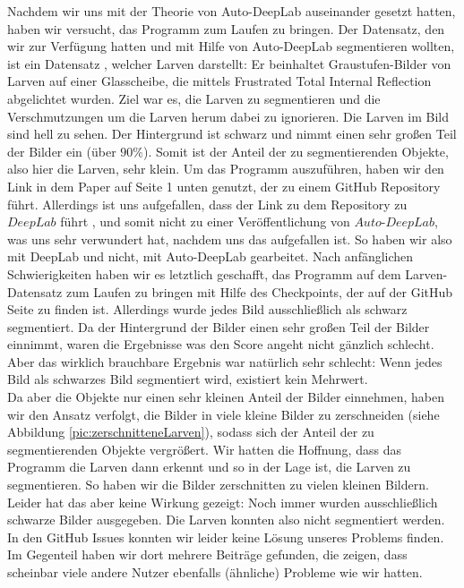 Nachdem wir uns mit der Theorie von Auto-DeepLab auseinander gesetzt hatten, haben wir versucht, das Programm zum Laufen zu bringen. Der Datensatz, den wir zur Verfügung hatten und mit Hilfe von Auto-DeepLab segmentieren wollten, ist ein Datensatz \cite{larven}, welcher Larven darstellt: Er beinhaltet Graustufen-Bilder von Larven auf einer Glasscheibe, die mittels Frustrated Total Internal Reflection abgelichtet wurden. Ziel war es, die Larven zu segmentieren und die Verschmutzungen um die Larven herum dabei zu ignorieren. Die Larven im Bild sind hell zu sehen. Der Hintergrund ist schwarz und nimmt einen sehr großen Teil der Bilder ein (über $90\%$). Somit ist der Anteil der zu segmentierenden Objekte, also hier die Larven, sehr klein. Um das Programm auszuführen, haben wir den Link in dem Paper \cite{autodeeplabPaper} auf Seite 1 unten genutzt, der zu einem GitHub Repository führt. Allerdings ist uns aufgefallen, dass der Link zu dem Repository zu $\textit{DeepLab}$ führt \cite{deeplabGithub}, und somit nicht zu einer Veröffentlichung von $\textit{Auto-DeepLab}$, was uns sehr verwundert hat, nachdem uns das aufgefallen ist. So haben wir also mit DeepLab und nicht, mit Auto-DeepLab gearbeitet. Nach anfänglichen Schwierigkeiten haben wir es letztlich geschafft, das Programm auf dem Larven-Datensatz zum Laufen zu bringen mit Hilfe des Checkpoints, der auf der GitHub Seite zu finden ist. Allerdings wurde jedes Bild ausschließlich als schwarz segmentiert. Da der Hintergrund der Bilder einen sehr großen Teil der Bilder einnimmt, waren die Ergebnisse was den Score angeht nicht gänzlich schlecht. Aber das wirklich brauchbare Ergebnis war natürlich sehr schlecht: Wenn jedes Bild als schwarzes Bild segmentiert wird, existiert kein Mehrwert.\\
Da aber die Objekte nur einen sehr kleinen Anteil der Bilder einnehmen, haben wir den Ansatz verfolgt, die Bilder in viele kleine Bilder zu zerschneiden (siehe Abbildung \ref{pic:zerschnitteneLarven}), sodass sich der Anteil der zu segmentierenden Objekte vergrößert. Wir hatten die Hoffnung, dass das Programm die Larven dann erkennt und so in der Lage ist, die Larven zu segmentieren. So haben wir die Bilder zerschnitten zu vielen kleinen Bildern.\\
Leider hat das aber keine Wirkung gezeigt: Noch immer wurden ausschließlich schwarze Bilder ausgegeben. Die Larven konnten also nicht segmentiert werden.\\
In den GitHub Issues konnten wir leider keine Lösung unseres Problems finden. Im Gegenteil haben wir dort mehrere Beiträge gefunden, die zeigen, dass scheinbar viele andere Nutzer ebenfalls (ähnliche) Probleme wie wir hatten.\\

